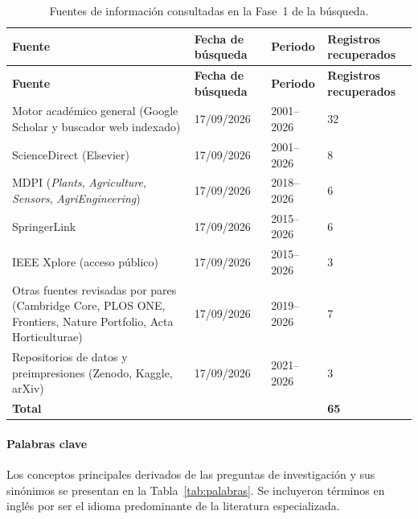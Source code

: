 \begin{longtable}{L{4.6cm}L{2.8cm}L{2.6cm}L{3.2cm}}
\caption{Fuentes de información consultadas en la Fase~1 de la búsqueda.}
\label{tab:fuentes} \\
\toprule
\textbf{Fuente} & \textbf{Fecha de búsqueda} & \textbf{Periodo} & \textbf{Registros recuperados} \\
\midrule
\endfirsthead
\toprule
\textbf{Fuente} & \textbf{Fecha de búsqueda} & \textbf{Periodo} & \textbf{Registros recuperados} \\
\midrule
\endhead
Motor académico general (Google Scholar y buscador web indexado) & 17/09/2026 & 2001--2026 & 32 \\
ScienceDirect (Elsevier) & 17/09/2026 & 2001--2026 & 8 \\
MDPI (\textit{Plants}, \textit{Agriculture}, \textit{Sensors}, \textit{AgriEngineering}) & 17/09/2026 & 2018--2026 & 6 \\
SpringerLink & 17/09/2026 & 2015--2026 & 6 \\
IEEE Xplore (acceso público) & 17/09/2026 & 2015--2026 & 3 \\
Otras fuentes revisadas por pares (Cambridge Core, PLOS ONE, Frontiers, Nature Portfolio, Acta Horticulturae) & 17/09/2026 & 2019--2026 & 7 \\
Repositorios de datos y preimpresiones (Zenodo, Kaggle, arXiv) & 17/09/2026 & 2021--2026 & 3 \\
\midrule
\textbf{Total} & & & \textbf{65} \\
\bottomrule
\end{longtable}

\paragraph{Palabras clave}

Los conceptos principales derivados de las preguntas de investigación y sus
sinónimos se presentan en la Tabla~\ref{tab:palabras}. Se incluyeron términos
en inglés por ser el idioma predominante de la literatura especializada.

